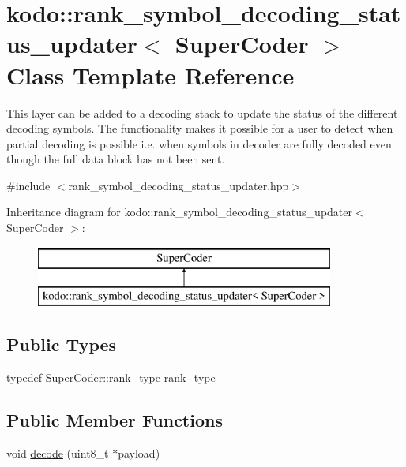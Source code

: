 \hypertarget{classkodo_1_1rank__symbol__decoding__status__updater}{\section{kodo\-:\-:rank\-\_\-symbol\-\_\-decoding\-\_\-status\-\_\-updater$<$ Super\-Coder $>$ Class Template Reference}
\label{classkodo_1_1rank__symbol__decoding__status__updater}
}


This layer can be added to a decoding stack to update the status of the different decoding symbols. The functionality makes it possible for a user to detect when partial decoding is possible i.\-e. when symbols in decoder are fully decoded even though the full data block has not been sent.  




{\ttfamily \#include $<$rank\-\_\-symbol\-\_\-decoding\-\_\-status\-\_\-updater.\-hpp$>$}

Inheritance diagram for kodo\-:\-:rank\-\_\-symbol\-\_\-decoding\-\_\-status\-\_\-updater$<$ Super\-Coder $>$\-:\begin{figure}[H]
\begin{center}
\leavevmode
\includegraphics[height=2.000000cm]{classkodo_1_1rank__symbol__decoding__status__updater}
\end{center}
\end{figure}
\subsection*{Public Types}
\begin{DoxyCompactItemize}
\item 
typedef Super\-Coder\-::rank\-\_\-type \hyperlink{classkodo_1_1rank__symbol__decoding__status__updater_a9ed8604c6f80b2408ca5a518aec17fd0}{rank\-\_\-type}
\begin{DoxyCompactList}\small\item\em \end{DoxyCompactList}\end{DoxyCompactItemize}
\subsection*{Public Member Functions}
\begin{DoxyCompactItemize}
\item 
void \hyperlink{classkodo_1_1rank__symbol__decoding__status__updater_a929f7ed41f069990bf3afe99144815a2}{decode} (uint8\-\_\-t $\ast$payload)
\begin{DoxyCompactList}\small\item\em \end{DoxyCompactList}\end{DoxyCompactItemize}


